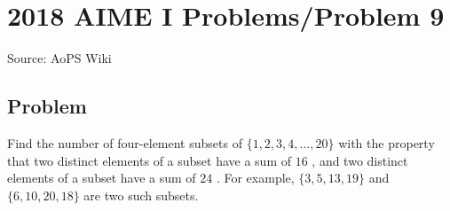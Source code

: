 \documentclass[12pt]{article}
\begin{document}
\section*{{2018 AIME I Problems/Problem 9}}
Source: AoPS Wiki

\subsection*{Problem}
Find the number of four-element subsets of $\{1,2,3,4,\dots, 20\}$ with the property that two distinct elements of a subset have a sum of $16$ , and two distinct elements of a subset have a sum of $24$ . For example, $\{3,5,13,19\}$ and $\{6,10,20,18\}$ are two such subsets.
\end{document}
